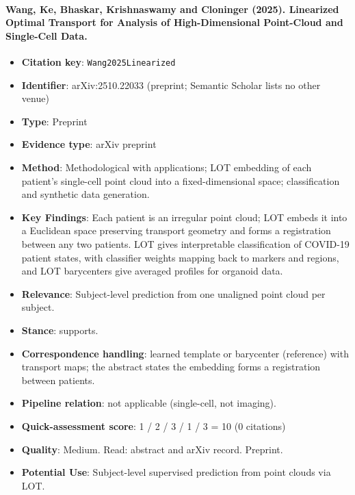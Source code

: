 \documentclass[journal,onecolumn]{IEEEtran}
\begin{document}
\paragraph{Wang, Ke, Bhaskar, Krishnaswamy and Cloninger (2025). Linearized Optimal Transport for Analysis of High-Dimensional Point-Cloud and Single-Cell Data.~\cite{Wang2025Linearized}}\mbox{}

\begin{itemize}

\item{} \textbf{Citation key}: \texttt{Wang2025Linearized}

\item{} \textbf{Identifier}: arXiv:2510.22033 (preprint; Semantic Scholar lists no other venue)

\item{} \textbf{Type}: Preprint

\item{} \textbf{Evidence type}: arXiv preprint

\item{} \textbf{Method}: Methodological with applications; LOT embedding of each patient's single-cell point cloud into a fixed-dimensional space; classification and synthetic data generation.

\item{} \textbf{Key Findings}: Each patient is an irregular point cloud; LOT embeds it into a Euclidean space preserving transport geometry and forms a registration between any two patients. LOT gives interpretable classification of COVID-19 patient states, with classifier weights mapping back to markers and regions, and LOT barycenters give averaged profiles for organoid data.

\item{} \textbf{Relevance}: Subject-level prediction from one unaligned point cloud per subject.

\item{} \textbf{Stance}: supports.

\item{} \textbf{Correspondence handling}: learned template or barycenter (reference) with transport maps; the abstract states the embedding forms a registration between patients.

\item{} \textbf{Pipeline relation}: not applicable (single-cell, not imaging).

\item{} \textbf{Quick-assessment score}: 1 / 2 / 3 / 1 / 3 = 10 (0 citations)

\item{} \textbf{Quality}: Medium. Read: abstract and arXiv record. Preprint.

\item{} \textbf{Potential Use}: Subject-level supervised prediction from point clouds via LOT.

\end{itemize}
\end{document}
